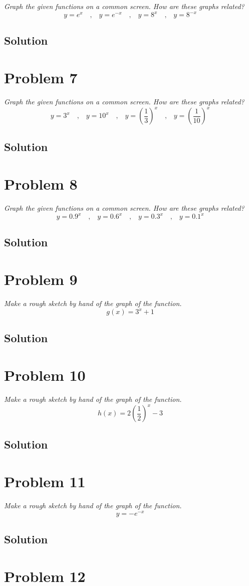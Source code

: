\documentclass[11pt]{article}
\newcommand{\soln}{\subsection*}
\newcommand{\qn}{\textit}
\newcommand{\eqtext}[1]{\quad\text{#1}\quad}
\begin{document}
\qn{Graph the given functions on a common screen. How are these graphs related? $$y=e^x \eqtext{,} y=e^{-x} \eqtext{,} y=8^x \eqtext{,} y=8^{-x}$$}

\soln{Solution}

\section*{Problem 7}

\qn{Graph the given functions on a common screen. How are these graphs related? $$y=3^x \eqtext{,} y=10^x \eqtext{,} y=(\frac{1}{3})^x \eqtext{,} y=(\frac{1}{10})^x$$}

\soln{Solution}

\section*{Problem 8}

\qn{Graph the given functions on a common screen. How are these graphs related? $$y=0.9^x \eqtext{,} y=0.6^x \eqtext{,} y=0.3^x \eqtext{,} y=0.1^x$$}

\soln{Solution}

\section*{Problem 9}

\qn{Make a rough sketch by hand of the graph of the function. $$g(x)=3^x+1$$}

\soln{Solution}

\section*{Problem 10}

\qn{Make a rough sketch by hand of the graph of the function. $$h(x)=2(\frac{1}{2})^x-3$$}

\soln{Solution}

\section*{Problem 11}

\qn{Make a rough sketch by hand of the graph of the function. $$y=-e^{-x}$$}

\soln{Solution}

\section*{Problem 12}
\end{document}
